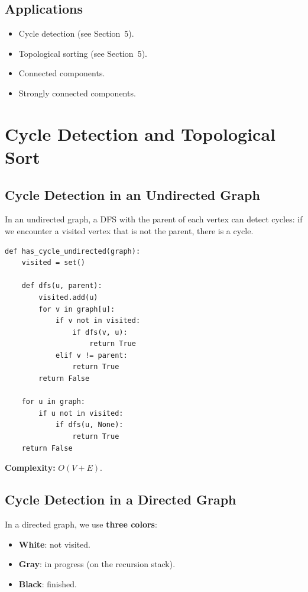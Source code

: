 \documentclass[11pt,a4paper]{article}
\begin{document}
\subsection{Applications}

\begin{itemize}
    \item Cycle detection (see Section~5).
    \item Topological sorting (see Section~5).
    \item Connected components.
    \item Strongly connected components.
\end{itemize}

\section{Cycle Detection and Topological Sort}

\subsection{Cycle Detection in an Undirected Graph}

In an undirected graph, a DFS with the parent of each vertex can detect cycles: if we encounter a visited vertex that is not the parent, there is a cycle.

\begin{lstlisting}
def has_cycle_undirected(graph):
    visited = set()

    def dfs(u, parent):
        visited.add(u)
        for v in graph[u]:
            if v not in visited:
                if dfs(v, u):
                    return True
            elif v != parent:
                return True
        return False

    for u in graph:
        if u not in visited:
            if dfs(u, None):
                return True
    return False
\end{lstlisting}

\textbf{Complexity:} $O(V + E)$.

\subsection{Cycle Detection in a Directed Graph}

In a directed graph, we use \textbf{three colors}:
\begin{itemize}
    \item \textbf{White}: not visited.
    \item \textbf{Gray}: in progress (on the recursion stack).
    \item \textbf{Black}: finished.
\end{itemize}
\end{document}
